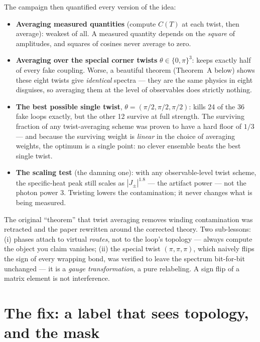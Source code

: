 \documentclass[11pt,a4paper]{article}
\newcommand{\Jpm}{J_{\pm}}
\begin{document}
The campaign then quantified every version of the idea:
\begin{itemize}
\item \textbf{Averaging measured quantities} (compute $C(T)$ at each twist,
then average): weakest of all.  A measured quantity depends on the
\emph{square} of amplitudes, and squares of cosines never average to zero.
\item \textbf{Averaging over the special corner twists} $\theta\in\{0,\pi\}^3$:
keeps exactly half of every fake coupling.  Worse, a beautiful theorem
(Theorem~A below) shows these eight twists give \emph{identical} spectra ---
they are the same physics in eight disguises, so averaging them at the level
of observables does strictly nothing.
\item \textbf{The best possible single twist}, $\theta=(\pi/2,\pi/2,\pi/2)$:
kills 24 of the 36 fake loops exactly, but the other 12 survive at full
strength.  The surviving fraction of any twist-averaging scheme was proven to
have a hard floor of $1/3$ --- and because the surviving weight is
\emph{linear} in the choice of averaging weights, the optimum is a single
point: no clever ensemble beats the best single twist.
\item \textbf{The scaling test} (the damning one): with any observable-level
twist scheme, the specific-heat peak still scales as $|\Jpm|^{1.8}$ --- the
artifact power --- not the photon power $3$.  Twisting lowers the
contamination; it never changes what is being measured.
\end{itemize}

\begin{lesson}
The original ``theorem'' that twist averaging removes winding contamination
was retracted and the paper rewritten around the corrected theory.  Two
sub-lessons: (i) phases attach to virtual \emph{routes}, not to the loop's
topology --- always compute the object you claim vanishes; (ii) the special
twist $(\pi,\pi,\pi)$, which naively flips the sign of every wrapping bond,
was verified to leave the spectrum bit-for-bit unchanged --- it is a
\emph{gauge transformation}, a pure relabeling.  A sign flip of a matrix
element is not interference.
\end{lesson}

\section{The fix: a label that sees topology, and the mask}
\label{sec:mask}
\end{document}
